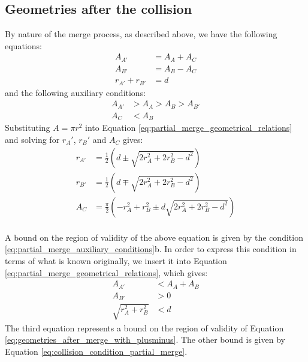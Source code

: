 \documentclass{article}
\begin{document}
\subsection{Geometries after the collision}
By nature of the merge process, as described above, we have the following equations:
\begin{equation}
\label{eq:partial_merge_geometrical_relations}
\begin{split}
A_{A'} &= A_A + A_C\\
A_{B'} &= A_B - A_C\\
r_{A'} + r_{B'} &= d
\end{split}
\end{equation}
%
and the following auxiliary conditions:
%
\begin{equation}
\label{eq:partial_merge_auxiliary_conditions}
\begin{split}
A_{A'} &> A_A > A_B > A_{B'}\\
A_C &< A_B
\end{split}
\end{equation}
Substituting $A = \pi r^2$ into Equation \ref{eq:partial_merge_geometrical_relations} and solving for $r_A'$, $r_B'$ and $A_C$ gives:
\begin{equation}
\label{eq:geometries_after_merge_with_plusminus}
\begin{split}
r_{A'} &= \frac{1}{2}\left(d \pm \sqrt{2r_A^2 + 2r_B^2 - d^2}\right)\\
r_{B'} &= \frac{1}{2}\left(d \mp \sqrt{2r_A^2 + 2r_B^2 - d^2}\right)\\
A_C &= \frac{\pi}{2}\left(-r_A^2 + r_B^2 \pm d\sqrt{2r_A^2 + 2r_B^2 - d^2}\right)\\
\end{split}
\end{equation}

A bound on the region of validity of the above equation is given by the condition \ref{eq:partial_merge_auxiliary_conditions}b. In order to express this condition in terms of what is known originally, we insert it into Equation \ref{eq:partial_merge_geometrical_relations}, which gives:
\begin{equation}
\label{eq:region_of_validity}
\begin{split}
A_{A'} &< A_A + A_B\\
A_{B'} &> 0\\
\sqrt{r_A^2 + r_B^2} &< d
\end{split}
\end{equation}
The third equation represents a bound on the region of validity of Equation \ref{eq:geometries_after_merge_with_plusminus}. The other bound is given by Equation \ref{eq:collision_condition_partial_merge}.
\end{document}
